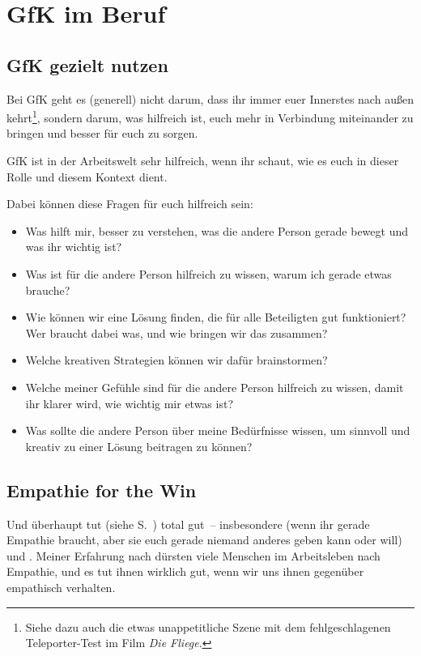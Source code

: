 \section{GfK im Beruf}
\label{gfk-im-beruf}


\subsection{GfK gezielt nutzen}

Bei GfK geht es (generell) nicht darum, dass ihr immer euer Innerstes nach außen kehrt\footnote{Siehe dazu auch die etwas unappetitliche Szene mit dem fehlgeschlagenen Teleporter-Test im Film \emph{Die Fliege}.}, sondern darum, was hilfreich ist, euch mehr in Verbindung miteinander zu bringen und besser für euch zu sorgen.

GfK ist in der Arbeitswelt sehr hilfreich, wenn ihr schaut, wie es euch in dieser Rolle und diesem Kontext dient.

Dabei können diese Fragen für euch hilfreich sein:

\begin{itemize}
  \item Was hilft mir, besser zu verstehen, was die andere Person gerade bewegt und was ihr wichtig ist?
  \item Was ist für die andere Person hilfreich zu wissen, warum ich gerade etwas brauche?
  \item Wie können wir eine Lösung finden, die für alle Beteiligten gut funktioniert? Wer braucht dabei was, und wie bringen wir das zusammen?
  \item Welche kreativen Strategien können wir dafür brainstormen?
  \item Welche meiner Gefühle sind für die andere Person hilfreich zu wissen, damit ihr klarer wird, wie wichtig mir etwas ist?
  \item Was sollte die andere Person über meine Bedürfnisse wissen, um sinnvoll und kreativ zu einer Lösung beitragen zu können?
\end{itemize}


\subsection{Empathie for the Win}

Und überhaupt tut  (siehe S.~\pageref{empathie}) total gut~-- insbesondere  (wenn ihr gerade Empathie braucht, aber sie euch gerade niemand anderes geben kann oder will) und . Meiner Erfahrung nach dürsten viele Menschen im Arbeitsleben nach Empathie, und es tut ihnen wirklich gut, wenn wir uns ihnen gegenüber empathisch verhalten.



